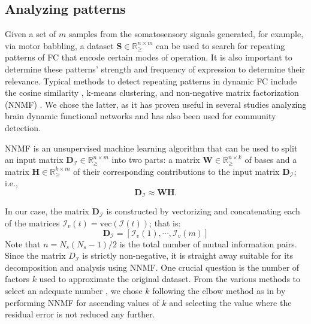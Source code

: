 \subsection{Analyzing patterns}
Given a set of $m$ samples from the somatosensory signals generated, for example, via motor babbling, a dataset $\bm{S} \in \mathbb{R}^{n \times m}_{\geq}$ can be used to search for repeating patterns of FC that encode certain modes of operation. It is also important to determine these patterns' strength and frequency of expression to determine their relevance. Typical methods to detect repeating patterns in dynamic FC include the cosine similarity \cite{Menon2019comparisonstaticdynamic}, k-means clustering\cite{Li2017Hightransitionfrequencies}, and  non-negative matrix factorization (NNMF) \cite{Fu2019Nonnegativematrixfactorization}. We chose the latter, as it has proven useful in several studies analyzing brain dynamic functional networks and has also been used for community  detection\cite{Wang2011Communitydiscoveryusing,Luo2021Symmetricnonnegativematrix}.

NNMF is an unsupervised machine learning algorithm that can be used to split an input matrix $\bm{D}_{\bm{\mathcal{I}}} \in \mathbb{R}^{n\times m}_{\geq}$ into two parts: a matrix $\bm{W} \in \mathbb{R}^{n\times k}_{\geq}$ of bases and a matrix $\bm{H} \in \mathbb{R}^{k\times m}_{\geq}$ of their corresponding contributions to the input matrix $\bm{D}_{\bm{\mathcal{I}}}$; i.e.,
\begin{equation}
	\bm{D}_{\bm{\mathcal{I}}} 	\approx \bm{W} \bm{H}.
\end{equation}

In our case, the matrix $\bm{D}_{\bm{\mathcal{I}}}$ is constructed by vectorizing  and concatenating each of the matrices $\bm{\mathcal{I}}_v(t) = \text{vec}\left(\bm{\mathcal{I}}(t)\right)$; that is: 
\begin{equation}
	\bm{D}_{\bm{\mathcal{I}}} = [\bm{\mathcal{I}}_v(1),\cdots,\bm{\mathcal{I}}_v(m)]
\end{equation}
Note that $n = N_s(N_s-1)/2$ is the total number of mutual information pairs. Since the matrix $D_{\bm{\mathcal{I}}}$ is strictly non-negative, it is straight away suitable for its decomposition and analysis using NNMF. One crucial question is the number of factors $k$ used to approximate the original dataset. From the various methods to select an adequate number \cite{Muzzarelli2019RankSelectionNon}, we chose $k$ following the elbow method as in \cite{Phalen2020Nonnegativematrix} by performing NNMF for ascending values of $k$ and selecting the value where the residual error is not reduced any further.

